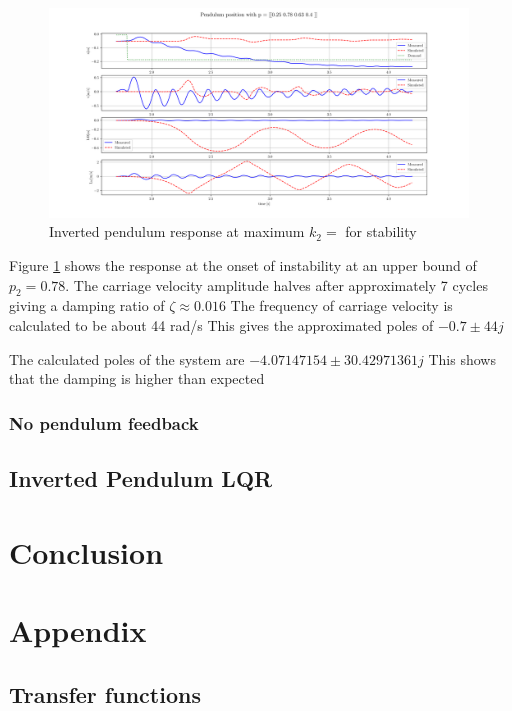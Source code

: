\documentclass{article}
\begin{document}
\begin{figure}[H]
  \centering
  \includegraphics[width=0.99\textwidth]{figures/4.4_hi.png}
  \caption{Inverted pendulum response at maximum $k_2 = $ for stability}
  \label{fig:roots4.4_hi}
\end{figure}

Figure \ref{fig:roots4.4_hi} shows the response at the onset of instability at an upper bound of $p_2 = 0.78$.
The carriage velocity amplitude halves after approximately 7 cycles giving a damping ratio of $\zeta \approx 0.016$
The frequency of carriage velocity is calculated to be about 44 rad/s
This gives the approximated poles of $-0.7 \pm 44j$

The calculated poles of the system are $-4.07147154 \pm 30.42971361j$
This shows that the damping is higher than expected 

\subsubsection{No pendulum feedback}


\subsection{Inverted Pendulum LQR}




\section{Conclusion}


\newpage
\section{Appendix}

\subsection{Transfer functions}
\end{document}
